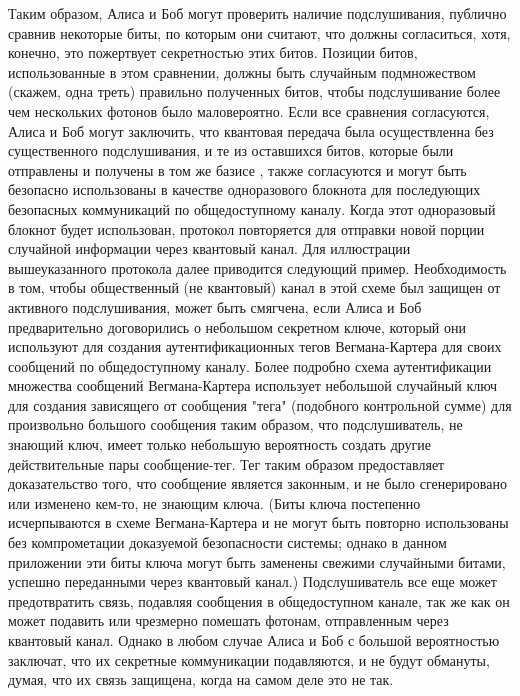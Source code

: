 Таким образом, Алиса и Боб могут проверить наличие подслушивания, публично сравнив некоторые биты, по которым они считают, что должны согласиться, хотя, конечно, это пожертвует секретностью этих битов. Позиции битов, использованные в этом сравнении, должны быть случайным подмножеством (скажем, одна треть) правильно полученных битов, чтобы подслушивание более чем нескольких фотонов было маловероятно. Если все сравнения согласуются, Алиса и Боб могут заключить, что квантовая передача была осуществленна без существенного подслушивания, и те из оставшихся битов, которые были отправлены и получены в том же базисе , также согласуются и могут быть безопасно использованы в качестве одноразового блокнота для последующих безопасных коммуникаций по общедоступному каналу. Когда этот одноразовый блокнот будет использован, протокол повторяется для отправки новой порции случайной информации через квантовый канал. Для иллюстрации вышеуказанного протокола далее приводится следующий пример. Необходимость в том, чтобы общественный (не квантовый) канал в этой схеме был защищен от активного подслушивания, может быть смягчена, если Алиса и Боб предварительно договорились о небольшом секретном ключе, который они используют для создания аутентификационных тегов Вегмана-Картера для своих сообщений по общедоступному каналу. Более подробно схема аутентификации множества сообщений Вегмана-Картера использует небольшой случайный ключ для создания зависящего от сообщения "тега" (подобного контрольной сумме) для произвольно большого сообщения таким образом, что подслушиватель, не знающий ключ, имеет только небольшую вероятность создать другие действительные пары сообщение-тег. Тег таким образом предоставляет доказательство того, что сообщение является законным, и не было сгенерировано или изменено кем-то, не знающим ключа. (Биты ключа постепенно исчерпываются в схеме Вегмана-Картера и не могут быть повторно использованы без компрометации доказуемой безопасности системы; однако в данном приложении эти биты ключа могут быть заменены свежими случайными битами, успешно переданными через квантовый канал.) Подслушиватель все еще может предотвратить связь, подавляя сообщения в общедоступном канале, так же как он может подавить или чрезмерно помешать фотонам, отправленным через квантовый канал. Однако в любом случае Алиса и Боб с большой вероятностью заключат, что их секретные коммуникации подавляются, и не будут обмануты, думая, что их связь защищена, когда на самом деле это не так.

